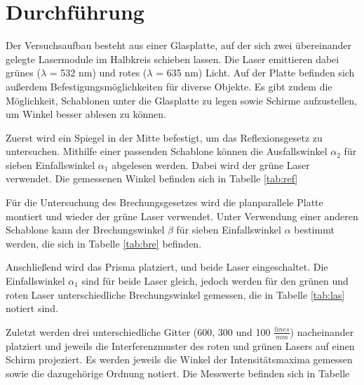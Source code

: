 \newpage
\section{Durchführung}
Der Versuchsaufbau besteht aus einer Glasplatte, auf der sich zwei übereinander gelegte 
Lasermodule im Halbkreis schieben lassen. Die Laser emittieren dabei grünes ($\lambda$ = 532 nm)
und rotes ($\lambda$ = 635 nm) Licht.
Auf der Platte befinden sich außerdem Befestigungsmöglichkeiten für diverse Objekte.
Es gibt zudem die Möglichkeit, Schablonen unter die Glasplatte zu legen sowie Schirme aufzustellen, um Winkel besser ablesen zu können.

\noindent
Zuerst wird ein Spiegel in der Mitte befestigt, um das Reflexionsgesetz zu untersuchen.
Mithilfe einer passenden Schablone können die Ausfallswinkel $\alpha_2$ für sieben Einfallswinkel $\alpha_1$ abgelesen werden.
Dabei wird der grüne Laser verwendet.
Die gemessenen Winkel befinden sich in Tabelle \ref{tab:ref}

\noindent
Für die Untersuchung des Brechungsgesetzes wird die planparallele Platte montiert und wieder der grüne Laser verwendet.
Unter Verwendung einer anderen Schablone kann der Brechungswinkel $\beta$ für sieben Einfallswinkel $\alpha$ bestimmt werden, 
die sich in Tabelle \ref{tab:bre} befinden. 

\noindent
Anschließend wird das Prisma platziert, und beide Laser eingeschaltet.
Die Einfallswinkel $\alpha_1$ sind für beide Laser gleich, jedoch werden für den grünen und roten Laser unterschiedliche Brechungswinkel gemessen, 
die in Tabelle \ref{tab:las} notiert sind.

\noindent
Zuletzt werden drei unterschiedliche Gitter (600, 300 und 100 $\frac{lines}{mm}$) nacheinander platziert und jeweils die Interferenzmuster des roten und grünen Lasers auf einen Schirm projeziert.
Es werden jeweils die Winkel der Intensitätsmaxima gemessen sowie die dazugehörige Ordnung notiert.
Die Messwerte befinden sich in Tabelle %
